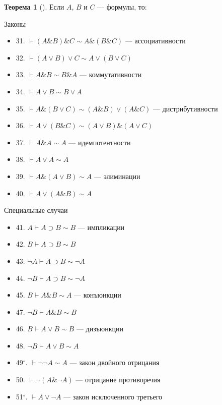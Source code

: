 \documentclass[a4paper, 12pt]{article}  %
\DeclareMathOperator{\conj}{\mathbb{\&}}
\theoremstyle{definition}
\newtheorem{theorem}{Теорема}
\begin{document}
	\begin{theorem}[]
		Если $A$, $B$ и $C$ --- формулы, то:
		
		Законы
		\begin{itemize}[label={}]
			\setlength\itemsep{0pt}
			\item 31. $\vdash (A \conj B) \conj C \sim A \conj (B \conj C)$ --- ассоциативности			
			\item 32. $\vdash (A \vee B) \vee C \sim A \vee (B \vee C)$				
			\item 33. $\vdash  A \conj B \sim B \conj A$  --- коммутативности			
			\item 34. $\vdash  A \vee B \sim B \vee A$
			\item 35. $\vdash A \conj (B \vee C) \sim (A \conj B) \vee (A \conj C)$ --- дистрибутивности				
			\item 36. $\vdash A \vee (B \conj C) \sim (A \vee B) \conj (A \vee C)$				
			\item 37. $\vdash A \conj A \sim A$ --- идемпотентности 				
			\item 38. $\vdash A \vee A \sim A$		
			\item 39. $\vdash A \conj (A \vee B) \sim A$ --- элиминации			
			\item 40. $\vdash A \vee (A \conj B) \sim A$
		\end{itemize}
		
		Специальные случаи
		\begin{itemize}[label={}]
			\setlength\itemsep{0pt}	
			\item 41. $A \vdash A \supset B \sim B$	--- импликации		
			\item 42. $B \vdash A \supset B \sim B$			
			\item 43. $\neg A \vdash A \supset B \sim \neg A$			
			\item 44. $\neg B \vdash A \supset B \sim \neg A$			
			\item 45. $B \vdash A \conj B \sim A$ --- конъюнкции			
			\item 47. $\neg B \vdash A \conj B \sim B$	
			\item 46. $B \vdash A \vee B \sim B$	 --- дизъюнкции		
			\item 48. $\neg B \vdash A \vee B \sim A$
		\end{itemize}
		
		\begin{itemize}[label={}]
			\setlength\itemsep{0pt}	
			\item 49$^\circ$. $\vdash \neg \neg A \sim A$ --- закон двойного отрицания		
			\item 50. $\vdash \neg (A \conj \neg A)$ --- отрицание противоречия		
			\item 51$^\circ$. $\vdash A \vee \neg A$ --- закон исключенного третьего
		\end{itemize}
		

\end{theorem}
\end{document}
